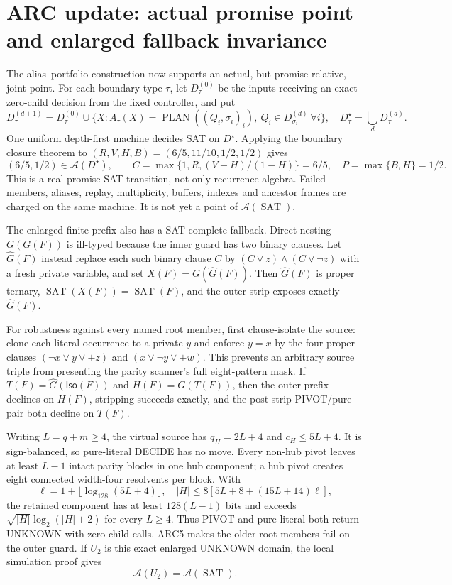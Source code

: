 \section{ARC update: actual promise point and enlarged fallback invariance}

The alias--portfolio construction now supports an actual, but promise-relative,
joint point.  For each boundary type $\tau$, let $D_\tau^{(0)}$ be the inputs
receiving an exact zero-child decision from the fixed controller, and put
\[
D_\tau^{(d+1)}=D_\tau^{(0)}\cup
\{X:A_\tau(X)=\operatorname{PLAN}((Q_i,\sigma_i)_i),\ 
Q_i\in D_{\sigma_i}^{(d)}\ \forall i\},
\quad D_\tau^\star=\bigcup_dD_\tau^{(d)}.
\]
One uniform depth-first machine decides SAT on $D^\star$.  Applying the
boundary closure theorem to
$(R,V,H,B)=(6/5,11/10,1/2,1/2)$ gives
\[
 (6/5,1/2)\in\mathcal A(D^\star),\qquad
 C=\max\{1,R,(V-H)/(1-H)\}=6/5,\quad P=\max\{B,H\}=1/2.
\]
This is a real promise-SAT transition, not only recurrence algebra.  Failed
members, aliases, replay, multiplicity, buffers, indexes and ancestor frames
are charged on the same machine.  It is not yet a point of
$\mathcal A(\operatorname{SAT})$.

The enlarged finite prefix also has a SAT-complete fallback.  Direct nesting
$G(G(F))$ is ill-typed because the inner guard has two binary clauses.  Let
$\widehat G(F)$ instead replace each such binary clause $C$ by
$(C\vee z)\wedge(C\vee\neg z)$ with a fresh private variable, and set
$X(F)=G(\widehat G(F))$.  Then $\widehat G(F)$ is proper ternary,
$\operatorname{SAT}(X(F))=\operatorname{SAT}(F)$, and the outer strip exposes
exactly $\widehat G(F)$.

For robustness against every named root member, first clause-isolate the
source: clone each literal occurrence to a private $y$ and enforce $y=x$ by
the four proper clauses $(\neg x\vee y\vee\pm z)$ and
$(x\vee\neg y\vee\pm w)$.  This prevents an arbitrary source triple from
presenting the parity scanner's full eight-pattern mask.  If
$T(F)=\widehat G(\mathsf{Iso}(F))$ and $H(F)=G(T(F))$, then the outer prefix
declines on $H(F)$, stripping succeeds exactly, and the post-strip
PIVOT/pure pair both decline on $T(F)$.

Writing $L=q+m\ge4$, the virtual source has
$q_H=2L+4$ and $c_H\le5L+4$.  It is sign-balanced, so pure-literal DECIDE has
no move.  Every non-hub pivot leaves at least $L-1$ intact parity blocks in
one hub component; a hub pivot creates eight connected width-four resolvents
per block.  With
\[
\ell=1+\lfloor\log_{128}(5L+4)\rfloor,
\quad |H|\le8[5L+8+(15L+14)\ell],
\]
the retained component has at least $128(L-1)$ bits and exceeds
$\sqrt{|H|}\log_2(|H|+2)$ for every $L\ge4$.  Thus PIVOT and pure-literal
both return UNKNOWN with zero child calls.  ARC5 makes the older root members
fail on the outer guard.  If $U_2$ is this exact enlarged UNKNOWN domain, the
local simulation proof gives
\[
 \boxed{\mathcal A(U_2)=\mathcal A(\operatorname{SAT}).}
\]


